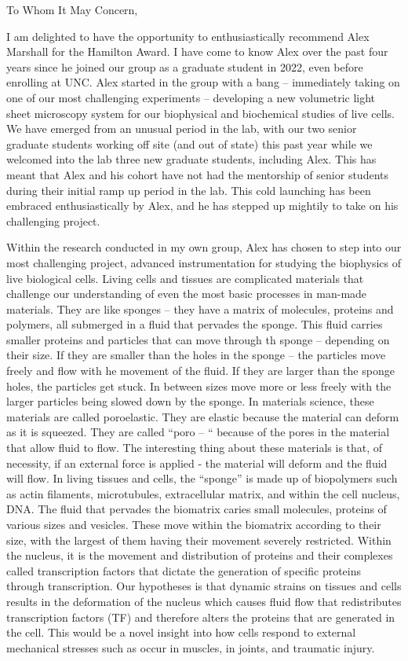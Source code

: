 To Whom It May Concern,\par
\begin{indented}
I am delighted to have the opportunity to enthusiastically recommend Alex Marshall for the Hamilton Award. I have come to know Alex over the past four years since he joined our group as a graduate student in 2022, even before enrolling at UNC. Alex started in the group with a bang – immediately taking on one of our most challenging experiments – developing a new volumetric light sheet microscopy system for our biophysical and biochemical studies of live cells.  We have emerged from an unusual period in the lab, with our two senior graduate students working off site (and out of state) this past year while we welcomed into the lab three new graduate students, including Alex. This has meant that Alex and his cohort have not had the mentorship of senior students during their initial ramp up period in the lab. This cold launching has been embraced enthusiastically by Alex, and he has stepped up mightily to take on his challenging project.\par
Within the research conducted in my own group, Alex has chosen to step into our most challenging project, advanced instrumentation for studying the biophysics of live biological cells. Living cells and tissues are complicated materials that challenge our understanding of even the most basic processes in man-made materials. They are like sponges – they have a matrix of molecules, proteins and polymers, all submerged in a fluid that pervades the sponge. This fluid carries smaller proteins and particles that can move through th sponge – depending on their size. If they are smaller than the holes in the sponge – the particles move freely and flow with he movement of the fluid. If they are larger than the sponge holes, the particles get stuck. In between sizes move more or less freely with the larger particles being slowed down by the sponge. In materials science, these materials are called poroelastic. They are elastic because the material can deform as it is squeezed. They are called “poro – “ because of the pores in the material that allow fluid to flow. The interesting thing about these materials is that, of necessity, if an external force is applied -  the material will deform and the fluid will flow. In living tissues and cells, the “sponge” is made up of biopolymers such as actin filaments, microtubules, extracellular matrix, and within the cell nucleus, DNA. The fluid that pervades the biomatrix caries small molecules, proteins of various sizes and vesicles. These move within the biomatrix according to their size, with the largest of them having their movement severely restricted. Within the nucleus, it is the movement and distribution of proteins and their complexes called transcription factors that dictate the generation of specific proteins through transcription. Our hypotheses is that dynamic strains on tissues and cells results in the deformation of the nucleus which causes fluid flow that redistributes transcription factors (TF) and therefore alters the proteins that are generated in the cell. This would be a novel insight into how cells respond to external mechanical stresses such as occur in muscles, in joints, and traumatic injury. \par

\end{indented}
